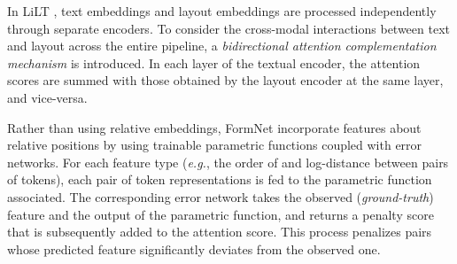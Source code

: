 



In \ac{LiLT} \citep{wang2022lilt}, text embeddings and layout embeddings are processed independently through separate encoders. To consider the cross-modal interactions between text and layout across the entire pipeline, a \textit{bidirectional attention complementation mechanism} is introduced. In each layer of the textual encoder, the attention scores are summed with those obtained by the layout encoder at the same layer, and vice-versa.   

Rather than using relative embeddings, FormNet \citep{lee2022formnet} incorporate features about relative positions by using trainable parametric functions coupled with error networks. For each feature type (\textit{e.g.}, the order of and log-distance between pairs of tokens), each pair of token representations is fed to the parametric function associated. The corresponding error network takes the observed (\textit{ground-truth}) feature and the output of the parametric function, and returns a penalty score that is subsequently added to the attention score. This process penalizes pairs whose predicted feature significantly deviates from the observed one.


